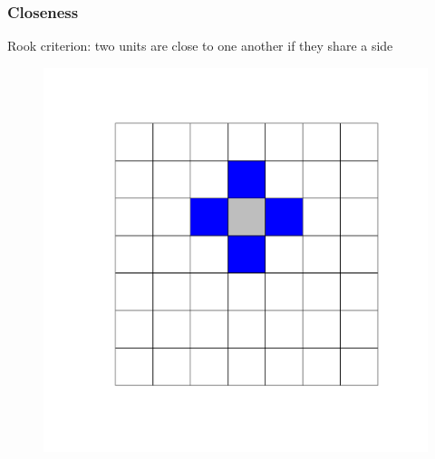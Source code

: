 \documentclass[
  shownotes,
  xcolor={svgnames},
  hyperref={colorlinks,citecolor=DarkBlue,linkcolor=DarkRed,urlcolor=DarkBlue}
  ]{beamer}
\begin{document}
\begin{frame}[fragile]
\frametitle{Closeness}

\bigskip

\begin{minipage}[t]{0.45\linewidth}
Rook criterion: two units are close to one another if they share a side
  \begin{figure}[H] \centering
    \captionsetup{justification=centering}
    \includegraphics[scale=0.3]{figures/rook.pdf}
   \end{figure}
  

\end{minipage}
\end{frame}
\end{document}
